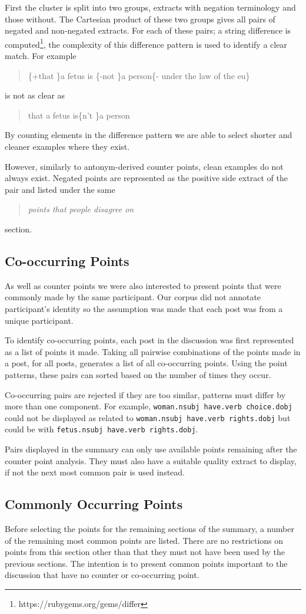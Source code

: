       First the cluster is split into two groups, extracts with negation terminology and those without. The Cartesian product of these two groups gives all pairs of negated and non-negated extracts. For each of these pairs; a string difference is computed\footnote{https://rubygems.org/gems/differ}, the complexity of this difference pattern is used to identify a clear match. For example \blockquote{\{+that \}a fetus is \{-not \}a person\{- under the law of the eu\}} is not as clear as \blockquote{that a fetus is\{n't \}a person}. By counting elements in the difference pattern we are able to select shorter and cleaner examples where they exist.

      However, similarly to antonym-derived counter points, clean examples do not always exist. Negated points are represented as the positive side extract of the pair and listed under the same \blockquote{\textit{points that people disagree on}} section.

    \subsection{Co-occurring Points}
      As well as counter points we were also interested to present points that were commonly made by the same participant. Our corpus did not annotate participant's identity so the assumption was made that each post was from a unique participant.

      To identify co-occurring points, each post in the discussion was first represented as a list of points it made. Taking all pairwise combinations of the points made in a post, for all posts, generates a list of all co-occurring points. Using the point patterns, these pairs can sorted based on the number of times they occur.

      Co-occurring pairs are rejected if they are too similar, patterns must differ by more than one component. For example, \texttt{woman.nsubj have.verb choice.dobj} could not be displayed as related to \texttt{woman.nsubj have.verb rights.dobj} but could be with \texttt{fetus.nsubj have.verb rights.dobj}.

      Pairs displayed in the summary can only use available points remaining after the counter point analysis. They must also have a suitable quality extract to display, if not the next most common pair is used instead.
    \subsection{Commonly Occurring Points}
      Before selecting the points for the remaining sections of the summary, a number of the remaining most common points are listed. There are no restrictions on points from this section other than that they must not have been used by the previous sections. The intention is to present common points important to the discussion that have no counter or co-occurring point.

